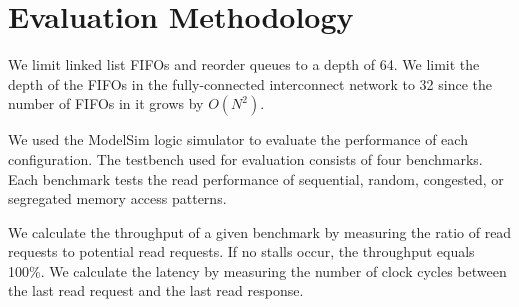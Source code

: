\section{Evaluation Methodology}
\label{sec:evaluation}
    We limit linked list FIFOs and reorder queues to a depth of 64. We limit the depth of the FIFOs in the fully-connected interconnect network to 32 since the number of FIFOs in it grows by $O(N^2)$.

    We used the ModelSim logic simulator to evaluate the performance of each configuration. The testbench used for evaluation consists of four benchmarks. Each benchmark tests the read performance of sequential, random, congested, or segregated memory access patterns.

    We calculate the throughput of a given benchmark by measuring the ratio of read requests to potential read requests. If no stalls occur, the throughput equals 100\%. We calculate the latency by measuring the number of clock cycles between the last read request and the last read response. 
